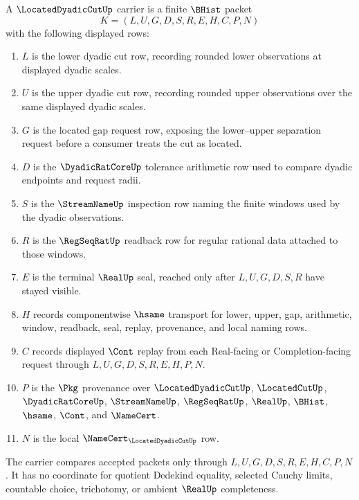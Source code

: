\begin{definition}
\label{def:located-dyadic-cut-carrier}
A $\LocatedDyadicCutUp$ carrier is a finite $\BHist$ packet
$$
K=(L,U,G,D,S,R,E,H,C,P,N)
$$
with the following displayed rows:
\begin{enumerate}
\item $L$ is the lower dyadic cut row, recording rounded lower observations at displayed dyadic scales.
\item $U$ is the upper dyadic cut row, recording rounded upper observations over the same displayed dyadic scales.
\item $G$ is the located gap request row, exposing the lower--upper separation request before a consumer treats the cut as located.
\item $D$ is the $\DyadicRatCoreUp$ tolerance arithmetic row used to compare dyadic endpoints and request radii.
\item $S$ is the $\StreamNameUp$ inspection row naming the finite windows used by the dyadic observations.
\item $R$ is the $\RegSeqRatUp$ readback row for regular rational data attached to those windows.
\item $E$ is the terminal $\RealUp$ seal, reached only after $L,U,G,D,S,R$ have stayed visible.
\item $H$ records componentwise $\hsame$ transport for lower, upper, gap, arithmetic, window, readback, seal, replay, provenance, and local naming rows.
\item $C$ records displayed $\Cont$ replay from each Real-facing or Completion-facing request through $L,U,G,D,S,R,E,H,P,N$.
\item $P$ is the $\Pkg$ provenance over $\LocatedDyadicCutUp$, $\LocatedCutUp$, $\DyadicRatCoreUp$, $\StreamNameUp$, $\RegSeqRatUp$, $\RealUp$, $\BHist$, $\hsame$, $\Cont$, and $\NameCert$.
\item $N$ is the local $\NameCert_{\LocatedDyadicCutUp}$ row.
\end{enumerate}
The carrier compares accepted packets only through $L,U,G,D,S,R,E,H,C,P,N$. It has no coordinate for quotient Dedekind equality, selected Cauchy limits, countable choice, trichotomy, or ambient $\RealUp$ completeness.
\end{definition}

